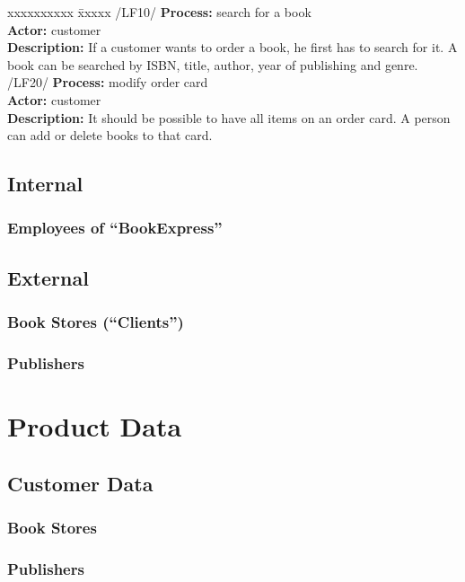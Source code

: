 \documentclass[11pt,a4paper,oneside,svgnames,draft]{report}
\begin{document}
\begin{tabbing}
    xxxxxxxxxx \= xxxxx \kill
    /LF10/ \> \textbf{Process:} search for a book\\
	\> \textbf{Actor:} customer\\ 
	\>\textbf{Description:} If a customer wants to order a book, he first has to search for it. A book can be searched by ISBN, title, author, year of publishing and genre.\\
	
	/LF20/ \> \textbf{Process:} modify order card\\
	\> \textbf{Actor:} customer\\ 
	\>\textbf{Description:} It should be possible to have all items on an order card. A person can add or delete books to that card.\\
\end{tabbing}
\section{Internal}
\subsection{Employees of ``BookExpress''}

\section{External}
\subsection{Book Stores (``Clients'')}
\subsection{Publishers}

\chapter{Product Data}
\section{Customer Data}
\subsection{Book Stores}
\subsection{Publishers}
\end{document}
